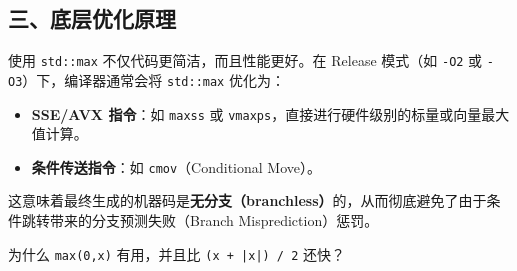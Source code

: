 \documentclass[11pt, a4paper]{article}
\begin{document}
\begin{aibox}
\subsection*{三、底层优化原理}

使用 \texttt{std::max} 不仅代码更简洁，而且性能更好。在 Release 模式（如 \texttt{-O2} 或 \texttt{-O3}）下，编译器通常会将 \texttt{std::max} 优化为：
\begin{itemize}
    \item \textbf{SSE/AVX 指令}：如 \texttt{maxss} 或 \texttt{vmaxps}，直接进行硬件级别的标量或向量最大值计算。
    \item \textbf{条件传送指令}：如 \texttt{cmov}（Conditional Move）。
\end{itemize}

这意味着最终生成的机器码是\textbf{无分支（branchless）}的，从而彻底避免了由于条件跳转带来的分支预测失败（Branch Misprediction）惩罚。
\end{aibox}

\vspace{1.5em}

\begin{userbox}
为什么 \texttt{max(0,x)} 有用，并且比 \texttt{(x + |x|) / 2} 还快？
\end{userbox}
\end{document}
